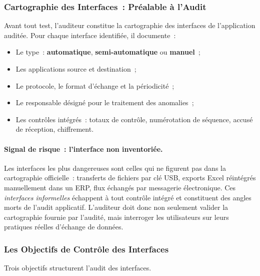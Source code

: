 \subsubsection{Cartographie des Interfaces~: Préalable à l'Audit}

Avant tout test, l'auditeur constitue la cartographie des interfaces de l'application
auditée. Pour chaque interface identifiée, il documente~:
\begin{itemize}
    \item Le type~: \textbf{automatique}, \textbf{semi-automatique} ou
        \textbf{manuel}~;
    \item Les applications source et destination~;
    \item Le protocole, le format d'échange et la périodicité~;
    \item Le responsable désigné pour le traitement des anomalies~;
    \item Les contrôles intégrés~: totaux de contrôle, numérotation de séquence,
        accusé de réception, chiffrement.
\end{itemize}

\paragraph{Signal de risque~: l'interface non inventoriée.}
Les interfaces les plus dangereuses sont celles qui ne figurent pas dans la
cartographie officielle~: transferts de fichiers par clé USB, exports Excel
réintégrés manuellement dans un ERP, flux échangés par messagerie électronique.
Ces \emph{interfaces informelles} échappent à tout contrôle intégré et constituent
des angles morts de l'audit applicatif. L'auditeur doit donc non seulement valider
la cartographie fournie par l'audité, mais interroger les utilisateurs sur leurs
pratiques réelles d'échange de données.

\subsubsection{Les Objectifs de Contrôle des Interfaces}

Trois objectifs structurent l'audit des interfaces.

